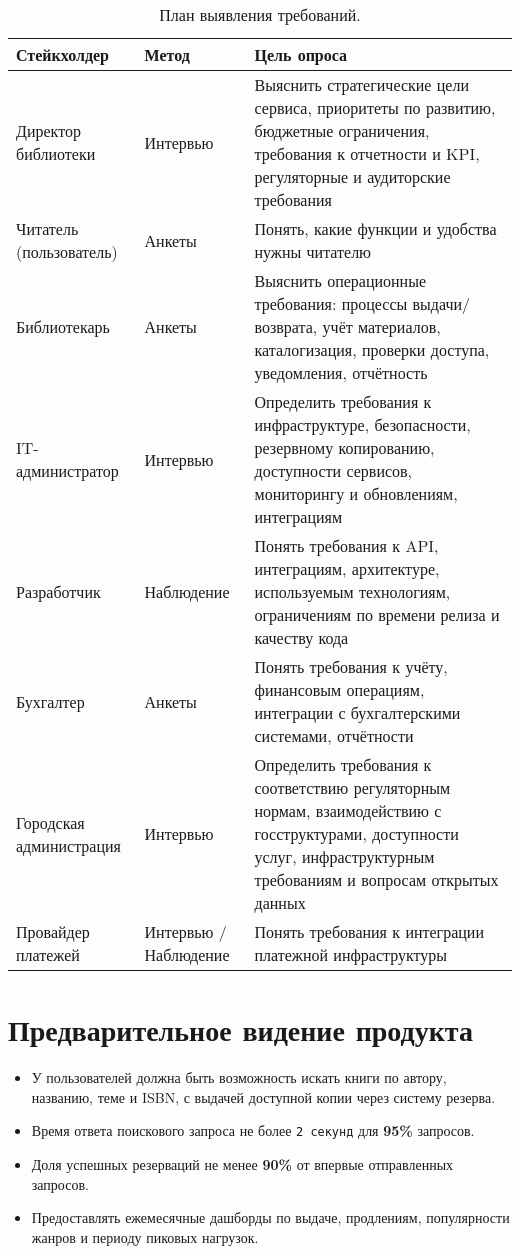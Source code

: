 \documentclass[12pt]{report}
\begin{document}
	\begin{table}[H]
		\centering
		\begin{tabular}{|>{\raggedright\arraybackslash}p{}|>{\raggedright\arraybackslash}p{}|>{\raggedright\arraybackslash}p{}|}
			\hline
			\textbf{Стейкхолдер} & \textbf{Метод} &	 \textbf{Цель опроса} \\
			\hline
			Директор библиотеки & Интервью & Выяснить стратегические цели сервиса, приоритеты по развитию, бюджетные ограничения, требования к отчетности и KPI, регуляторные и аудиторские требования \\
			\hline
			Читатель (пользователь) & Анкеты & Понять, какие функции и удобства нужны читателю \\
			\hline
			Библиотекарь & Анкеты & Выяснить операционные требования: процессы выдачи/возврата, учёт материалов, каталогизация, проверки доступа, уведомления, отчётность \\
			\hline
			IT-администратор & Интервью & Определить требования к инфраструктуре, безопасности, резервному копированию, доступности сервисов, мониторингу и обновлениям, интеграциям \\
			\hline
			Разработчик & Наблюдение & Понять требования к API, интеграциям, архитектуре, используемым технологиям, ограничениям по времени релиза и качеству кода \\
			\hline
			Бухгалтер & Анкеты & Понять требования к учёту, финансовым операциям, интеграции с бухгалтерскими системами, отчётности \\
			\hline
			Городская администрация & Интервью & Определить требования к соответствию регуляторным нормам, взаимодействию с госструктурами, доступности услуг, инфраструктурным требованиям и вопросам открытых данных \\
			\hline
			Провайдер платежей & Интервью / Наблюдение & Понять требования к интеграции платежной инфраструктуры \\
			\hline
		\end{tabular}
		\caption{План выявления требований.}
		\label{tab:requirements}
	\end{table}
	\newpage
	
	
	\section*{Предварительное видение продукта}
	
	\begin{itemize}
		\item У пользователей должна быть возможность искать книги по автору, названию, теме и ISBN, с выдачей доступной копии через систему резерва.
		\item Время ответа поискового запроса не более \texttt{2 секунд} для \textbf{95\%} запросов.
		\item Доля успешных резерваций не менее \textbf{90\%} от впервые отправленных запросов.
		\item Предоставлять ежемесячные дашборды по выдаче, продлениям, популярности жанров и периоду пиковых нагрузок.
	\end{itemize}
	
\end{document}
